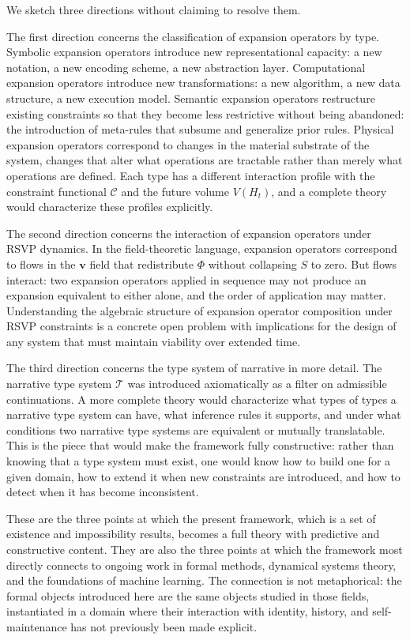 \documentclass[12pt, a4paper]{article}
\theoremstyle{plain}
\theoremstyle{definition}
\theoremstyle{remark}
\begin{document}
We sketch three directions without claiming to resolve them.

The first direction concerns the classification of expansion operators by type. Symbolic expansion operators introduce new representational capacity: a new notation, a new encoding scheme, a new abstraction layer. Computational expansion operators introduce new transformations: a new algorithm, a new data structure, a new execution model. Semantic expansion operators restructure existing constraints so that they become less restrictive without being abandoned: the introduction of meta-rules that subsume and generalize prior rules. Physical expansion operators correspond to changes in the material substrate of the system, changes that alter what operations are tractable rather than merely what operations are defined. Each type has a different interaction profile with the constraint functional $\mathcal{C}$ and the future volume $V(H_t)$, and a complete theory would characterize these profiles explicitly.

The second direction concerns the interaction of expansion operators under RSVP dynamics. In the field-theoretic language, expansion operators correspond to flows in the $\mathbf{v}$ field that redistribute $\Phi$ without collapsing $S$ to zero. But flows interact: two expansion operators applied in sequence may not produce an expansion equivalent to either alone, and the order of application may matter. Understanding the algebraic structure of expansion operator composition under RSVP constraints is a concrete open problem with implications for the design of any system that must maintain viability over extended time.

The third direction concerns the type system of narrative in more detail. The narrative type system $\mathcal{T}$ was introduced axiomatically as a filter on admissible continuations. A more complete theory would characterize what types of types a narrative type system can have, what inference rules it supports, and under what conditions two narrative type systems are equivalent or mutually translatable. This is the piece that would make the framework fully constructive: rather than knowing that a type system must exist, one would know how to build one for a given domain, how to extend it when new constraints are introduced, and how to detect when it has become inconsistent.

These are the three points at which the present framework, which is a set of existence and impossibility results, becomes a full theory with predictive and constructive content. They are also the three points at which the framework most directly connects to ongoing work in formal methods, dynamical systems theory, and the foundations of machine learning. The connection is not metaphorical: the formal objects introduced here are the same objects studied in those fields, instantiated in a domain where their interaction with identity, history, and self-maintenance has not previously been made explicit.
\end{document}
